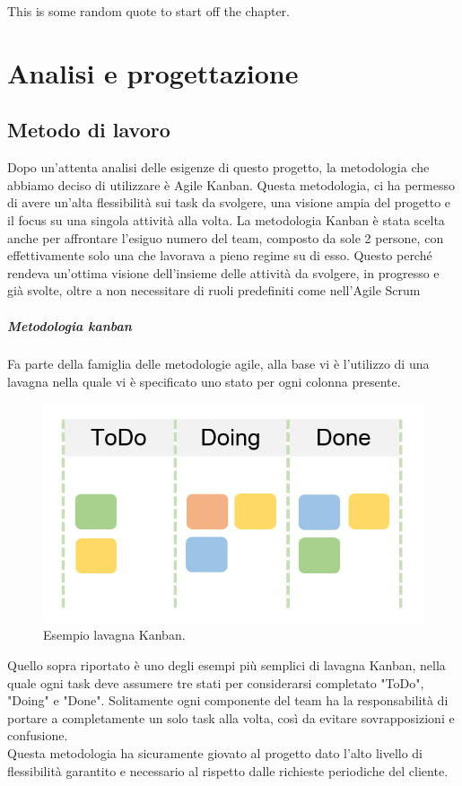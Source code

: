 \begin{savequote}[75mm]
This is some random quote to start off the chapter.
\end{savequote}

\chapter{Analisi e progettazione}

\section{Metodo di lavoro}
Dopo un'attenta analisi delle esigenze di questo progetto, la metodologia che abbiamo deciso di utilizzare è Agile Kanban. Questa metodologia, ci ha permesso di avere un'alta flessibilità sui task da svolgere, una visione ampia del progetto e il focus su una singola attività alla volta.
La metodologia Kanban è stata scelta anche per affrontare l'esiguo numero del team, composto da sole 2 persone, con effettivamente solo una che lavorava a pieno regime su di esso.
Questo perché rendeva un'ottima visione dell'insieme delle attività da svolgere, in progresso e già svolte, oltre a non necessitare di ruoli predefiniti come nell'\gls{Agile Scrum}
\paragraph{Metodologia kanban}
Fa parte della famiglia delle metodologie agile, alla base vi è l'utilizzo di una lavagna nella quale vi è specificato uno stato per ogni colonna presente.
\begin{figure}[h!]
	\centering
	\includegraphics[scale=0.3]{figures/kanban-board}
	\caption[Short figure name.]{Esempio lavagna Kanban.
		\label{fig:logoGCP}}
\end{figure}	
Quello sopra riportato è uno degli esempi più semplici di lavagna Kanban, nella quale ogni task deve assumere tre stati per considerarsi completato "ToDo", "Doing" e "Done". Solitamente ogni componente del team ha la responsabilità di portare a completamente un solo task alla volta, così da evitare sovrapposizioni e confusione.
\\ 
Questa metodologia ha sicuramente giovato al progetto dato l'alto livello di flessibilità garantito e necessario al rispetto dalle richieste periodiche del cliente.
